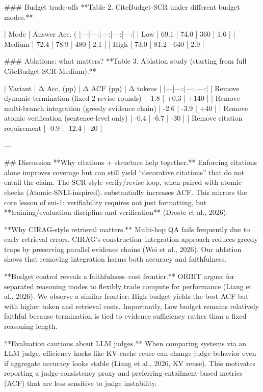 ### Budget trade-offs  
**Table 2. CiteBudget-SCR under different budget modes.**

| Mode | Answer Acc. (%
|---|---:|---:|---:|---:|
| Low | 69.1 | 74.0 | 360 | 1.6 |
| Medium | 72.4 | 78.9 | 480 | 2.1 |
| High | 73.0 | 81.2 | 640 | 2.9 |

### Ablations: what matters?  
**Table 3. Ablation study (starting from full CiteBudget-SCR Medium).**

| Variant | Δ Acc. (pp) | Δ ACF (pp) | Δ tokens |
|---|---:|---:|---:|
| Remove dynamic termination (fixed 2 revise rounds) | -1.8 | +0.3 | +140 |
| Remove multi-branch integration (greedy evidence chain) | -2.6 | -3.9 | +40 |
| Remove atomic verification (sentence-level only) | -0.4 | -6.7 | -30 |
| Remove citation requirement | -0.9 | -12.4 | -20 |

---

## Discussion  
**Why citations + structure help together.** Enforcing citations alone improves coverage but can still yield “decorative citations” that do not entail the claim. The SCR-style verify/revise loop, when paired with atomic checks (Atomic-SNLI-inspired), substantially increases ACF. This mirrors the core lesson of sui-1: verifiability requires not just formatting, but **training/evaluation discipline and verification** (Droste et al., 2026).  

**Why CIRAG-style retrieval matters.** Multi-hop QA fails frequently due to early retrieval errors. CIRAG’s construction–integration approach reduces greedy traps by preserving parallel evidence chains (Wei et al., 2026). Our ablation shows that removing integration harms both accuracy and faithfulness.  

**Budget control reveals a faithfulness–cost frontier.** ORBIT argues for separated reasoning modes to flexibly trade compute for performance (Liang et al., 2026). We observe a similar frontier: High budget yields the best ACF but with higher token and retrieval costs. Importantly, Low budget remains relatively faithful because termination is tied to evidence sufficiency rather than a fixed reasoning length.  

**Evaluation cautions about LLM judges.** When comparing systems via an LLM judge, efficiency hacks like KV-cache reuse can change judge behavior even if aggregate accuracy looks stable (Liang et al., 2026, KV reuse). This motivates reporting a judge-consistency proxy and preferring entailment-based metrics (ACF) that are less sensitive to judge instability.

